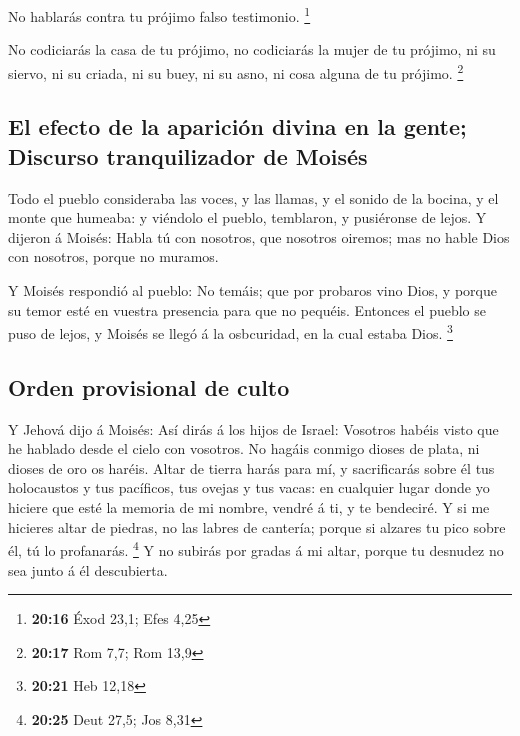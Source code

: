  No hablarás contra tu prójimo falso testimonio.
\footnote{\textbf{20:16} Éxod 23,1; Efes 4,25}

 No codiciarás la casa de tu prójimo, no codiciarás la
mujer de tu prójimo, ni su siervo, ni su criada, ni su buey, ni su asno,
ni cosa alguna de tu prójimo. \footnote{\textbf{20:17} Rom 7,7; Rom 13,9}

\hypertarget{el-efecto-de-la-apariciuxf3n-divina-en-la-gente-discurso-tranquilizador-de-moisuxe9s}{%
\subsection{El efecto de la aparición divina en la gente; Discurso
tranquilizador de
Moisés}\label{el-efecto-de-la-apariciuxf3n-divina-en-la-gente-discurso-tranquilizador-de-moisuxe9s}}

 Todo el pueblo consideraba las voces, y las llamas, y el
sonido de la bocina, y el monte que humeaba: y viéndolo el pueblo,
temblaron, y pusiéronse de lejos.  Y dijeron á Moisés:
Habla tú con nosotros, que nosotros oiremos; mas no hable Dios con
nosotros, porque no muramos.

 Y Moisés respondió al pueblo: No temáis; que por probaros
vino Dios, y porque su temor esté en vuestra presencia para que no
pequéis.  Entonces el pueblo se puso de lejos, y Moisés se
llegó á la osbcuridad, en la cual estaba Dios. \footnote{\textbf{20:21}
  Heb 12,18}

\hypertarget{orden-provisional-de-culto}{%
\subsection{Orden provisional de
culto}\label{orden-provisional-de-culto}}

 Y Jehová dijo á Moisés: Así dirás á los hijos de Israel:
Vosotros habéis visto que he hablado desde el cielo con vosotros.
 No hagáis conmigo dioses de plata, ni dioses de oro os
haréis.  Altar de tierra harás para mí, y sacrificarás
sobre él tus holocaustos y tus pacíficos, tus ovejas y tus vacas: en
cualquier lugar donde yo hiciere que esté la memoria de mi nombre,
vendré á ti, y te bendeciré.  Y si me hicieres altar de
piedras, no las labres de cantería; porque si alzares tu pico sobre él,
tú lo profanarás. \footnote{\textbf{20:25} Deut 27,5; Jos 8,31}
 Y no subirás por gradas á mi altar, porque tu desnudez no
sea junto á él descubierta.

